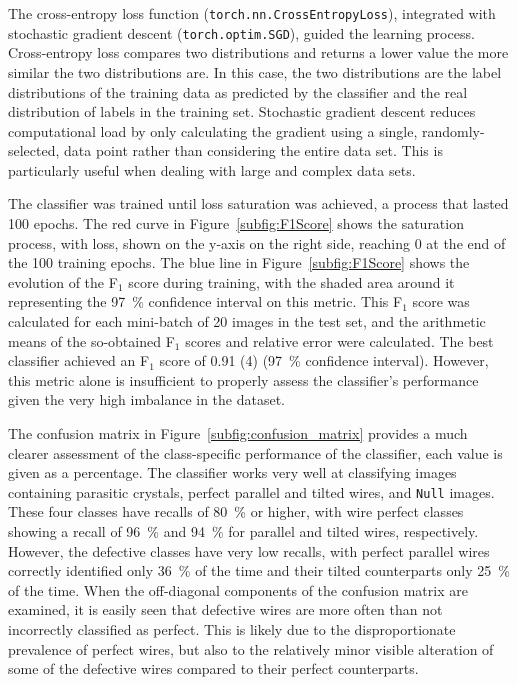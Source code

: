 The cross-entropy loss function (\texttt{torch.nn.CrossEntropyLoss}), integrated with stochastic gradient descent (\texttt{torch.optim.SGD}), guided the learning process. Cross-entropy loss compares two distributions and returns a lower value the more similar the two distributions are. In this case, the two distributions are the label distributions of the training data as predicted by the classifier and the real distribution of labels in the training set. Stochastic gradient descent reduces computational load by only calculating the gradient using a single, randomly-selected, data point rather than considering the entire data set. This is particularly useful when dealing with large and complex data sets.

The classifier was trained until loss saturation was achieved, a process that lasted \num{100} epochs. The red curve in Figure~\ref{subfig:F1Score} shows the saturation process, with loss, shown on the y-axis on the right side, reaching \num{0} at the end of the \num{100} training epochs. The blue line in Figure~\ref{subfig:F1Score} shows the evolution of the F\(_1\) score during training, with the shaded area around it representing the \qty{97}{\%} confidence interval on this metric. This F\(_1\) score was calculated for each mini-batch of 20 images in the test set, and the arithmetic means of the so-obtained F\(_1\) scores and relative error were calculated. The best classifier achieved an F\(_1\) score of \num[separate-uncertainty=true]{0.91 (4)} (\qty{97}{\%} confidence interval). However, this metric alone is insufficient to properly assess the classifier's performance given the very high imbalance in the dataset. 

The confusion matrix in Figure~\ref{subfig:confusion_matrix} provides a much clearer assessment of the class-specific performance of the classifier, each value is given as a percentage. The classifier works very well at classifying images containing parasitic crystals, perfect parallel and tilted wires, and \texttt{Null} images. These four classes have recalls of \qty{80}{\%} or higher, with wire perfect classes showing a recall of \qty{96}{\%} and \qty{94}{\%} for parallel and tilted wires, respectively. However, the defective classes have very low recalls, with perfect parallel wires correctly identified only \qty{36}{\%} of the time and their tilted counterparts only \qty{25}{\%} of the time. When the off-diagonal components of the confusion matrix are examined, it is easily seen that defective wires are more often than not incorrectly classified as perfect. This is likely due to the disproportionate prevalence of perfect wires, but also to the relatively minor visible alteration of some of the defective wires compared to their perfect counterparts.

